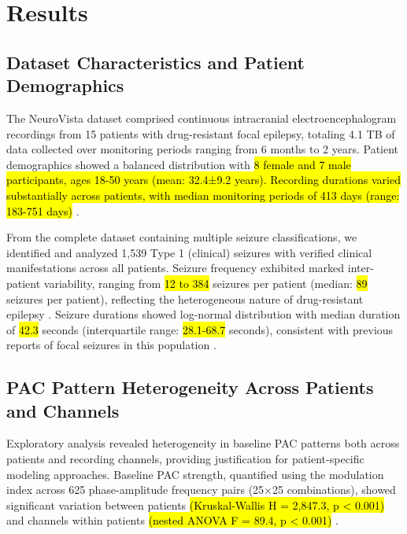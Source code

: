 \section{Results}

\subsection{Dataset Characteristics and Patient Demographics}
The NeuroVista dataset comprised continuous intracranial electroencephalogram recordings from 15 patients with drug-resistant focal epilepsy, totaling 4.1 TB of data collected over monitoring periods ranging from 6 months to 2 years. Patient demographics showed a balanced distribution with \hl{8 female and 7 male participants, ages 18-50 years (mean: 32.4±9.2 years). Recording durations varied substantially across patients, with median monitoring periods of 413 days (range: 183-751 days)} . 

	From the complete dataset containing multiple seizure classifications, we identified and analyzed 1,539 Type 1 (clinical) seizures with verified clinical manifestations across all patients. Seizure frequency exhibited marked inter-patient variability, ranging from \hl{12 to 384} seizures per patient (median: \hl{89} seizures per patient), reflecting the heterogeneous nature of drug-resistant epilepsy . Seizure durations showed log-normal distribution with median duration of \hl{42.3} seconds (interquartile range: \hl{28.1-68.7} seconds), consistent with previous reports of focal seizures in this population .

\subsection{PAC Pattern Heterogeneity Across Patients and Channels}
Exploratory analysis revealed heterogeneity in baseline PAC patterns both across patients and recording channels, providing justification for patient-specific modeling approaches. Baseline PAC strength, quantified using the modulation index across 625 phase-amplitude frequency pairs (25×25 combinations), showed significant variation between patients \hl{(Kruskal-Wallis H = 2,847.3, p < 0.001)} and channels within patients \hl{(nested ANOVA F = 89.4, p < 0.001)} .

